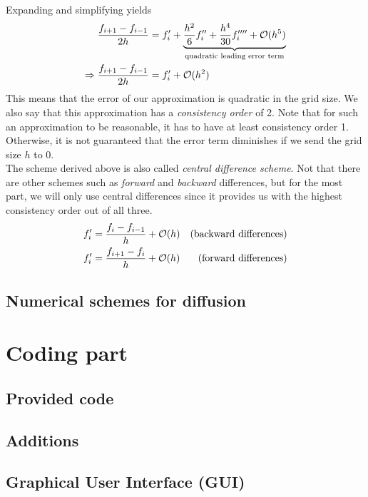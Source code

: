Expanding and simplifying yields
\begin{align}
        \frac{f_{i+1} - f_{i-1}}{2h} &= f_i' + \underbrace{\frac{h^2}{6}f_i'' + \frac{h^4}{30}f_i'''' +
        \mathcal{O}(h^5)}_\text{quadratic leading error term}\notag\\
            \Rightarrow \frac{f_{i+1} - f_{i-1}}{2h} &= f_i' + \mathcal{O}(h^2)
\end{align}
This means that the error of our approximation is quadratic in the grid size. 
We also say that this approximation has a \textit{consistency order} of 2. Note that for such an
approximation to be reasonable, it has to have at least consistency order 1. Otherwise, it is
not guaranteed that the error term diminishes if we send the grid size $h$ to 0.\\
The scheme derived above is also called \textit{central difference scheme}. Not that there are
other schemes such as \textit{forward} and \textit{backward} differences, but for the most part, we
will only use central differences since it provides us with the highest consistency
order out of all three. 
\begin{align}
    f_i' &= \frac{f_i - f_{i-1}}{h} + \mathcal{O}(h)&\textnormal{(backward differences)}\notag\\
    f_i' &= \frac{f_{i+1} - f_i}{h} + \mathcal{O}(h)&\textnormal{(forward differences)}\notag
\end{align}
\subsection{Numerical schemes for diffusion}
\section{Coding part}
\subsection{Provided code}
\subsection{Additions}
\subsection{Graphical User Interface (GUI)}
